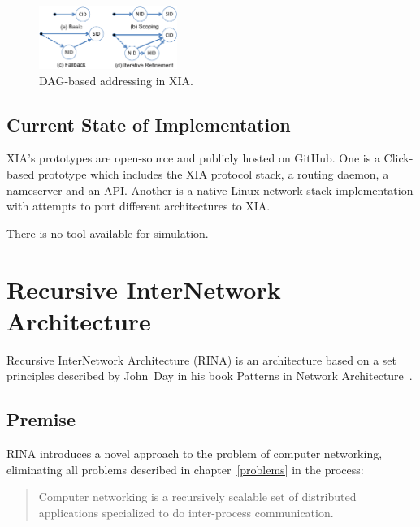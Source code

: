                 \begin{figure}[H]
                    \begin{center}
                        \includegraphics[width=0.4\textwidth]{fig/archs_xia-dag.pdf}
                        \caption{DAG-based addressing in XIA.}
                        \label{fig:xia_dag}
                    \end{center}
                \end{figure}

        \subsection{Current State of Implementation}

            XIA's prototypes are open-source and publicly hosted on GitHub. One is a Click-based prototype which includes the XIA protocol stack, a routing daemon, a nameserver and an API. Another is a native Linux network stack implementation with attempts to port different architectures to XIA.

            There is no tool available for simulation.

    \section{Recursive InterNetwork Architecture}\label{archs:rina}

        Recursive InterNetwork Architecture (RINA) is an architecture based on a set principles described by John~Day in his book Patterns in Network Architecture~\cite{Patterns}.

        \subsection{Premise}

            RINA introduces a novel approach to the problem of computer networking, eliminating all problems described in chapter~\ref{problems} in the process:

            \begin{quotation}
                \centering
                Computer networking is a recursively scalable set of distributed applications specialized to do inter-process communication.
            \end{quotation}

